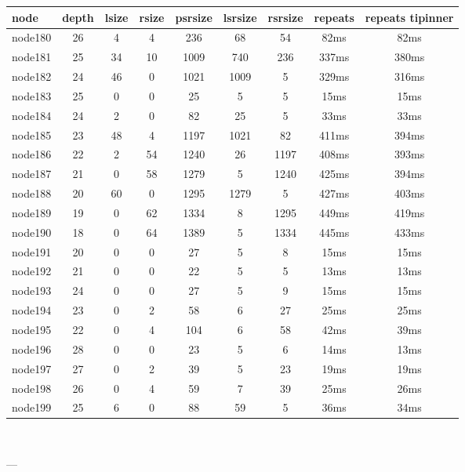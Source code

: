 \begin{tabular}{|l|c|c|c|c|c|c|c|c|}
\hline node & depth & lsize & rsize & psrsize & lsrsize & rsrsize   & repeats & repeats tipinner\\
    \hline node180 & 26 & 4 & 4 & 236 & 68 & 54 & 82ms & 82ms\\
    \hline node181 & 25 & 34 & 10 & 1009 & 740 & 236 & 337ms & 380ms\\
    \hline node182 & 24 & 46 & 0 & 1021 & 1009 & 5 & 329ms & 316ms\\
    \hline node183 & 25 & 0 & 0 & 25 & 5 & 5 & 15ms & 15ms\\
    \hline node184 & 24 & 2 & 0 & 82 & 25 & 5 & 33ms & 33ms\\
    \hline node185 & 23 & 48 & 4 & 1197 & 1021 & 82 & 411ms & 394ms\\
    \hline node186 & 22 & 2 & 54 & 1240 & 26 & 1197 & 408ms & 393ms\\
    \hline node187 & 21 & 0 & 58 & 1279 & 5 & 1240 & 425ms & 394ms\\
    \hline node188 & 20 & 60 & 0 & 1295 & 1279 & 5 & 427ms & 403ms\\
    \hline node189 & 19 & 0 & 62 & 1334 & 8 & 1295 & 449ms & 419ms\\
    \hline node190 & 18 & 0 & 64 & 1389 & 5 & 1334 & 445ms & 433ms\\
    \hline node191 & 20 & 0 & 0 & 27 & 5 & 8 & 15ms & 15ms\\
    \hline node192 & 21 & 0 & 0 & 22 & 5 & 5 & 13ms & 13ms\\
    \hline node193 & 24 & 0 & 0 & 27 & 5 & 9 & 15ms & 15ms\\
    \hline node194 & 23 & 0 & 2 & 58 & 6 & 27 & 25ms & 25ms\\
    \hline node195 & 22 & 0 & 4 & 104 & 6 & 58 & 42ms & 39ms\\
    \hline node196 & 28 & 0 & 0 & 23 & 5 & 6 & 14ms & 13ms\\
    \hline node197 & 27 & 0 & 2 & 39 & 5 & 23 & 19ms & 19ms\\
    \hline node198 & 26 & 0 & 4 & 59 & 7 & 39 & 25ms & 26ms\\
    \hline node199 & 25 & 6 & 0 & 88 & 59 & 5 & 36ms & 34ms\\

\hline
\end{tabular} \

---


